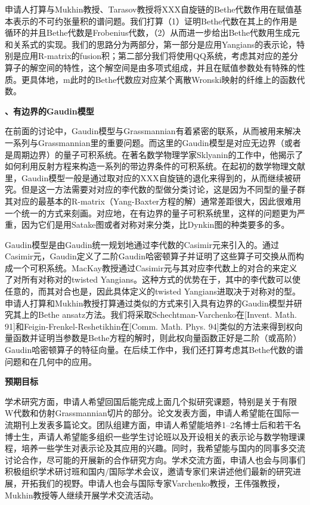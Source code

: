 \documentclass[12pt,UTF8,AutoFakeBold=4,a4paper]{ctexart}
\begin{document}
申请人打算与Mukhin教授、Tarasov教授将XXX自旋链的Bethe代数作用在赋值基本表示的不可约张量积的谱问题。我们打算（1）证明Bethe代数在其上的作用是循环的并且Bethe代数是Frobenius代数，（2）从而进一步给出Bethe代数用生成元和关系式的实现。我们的思路分为两部分，第一部分是应用Yangians的表示论，特别是应用R-matrix的fusion积；第二部分我们将使用QQ系统，考虑其对应的差分算子的解空间的特性，这个解空间是由多项式组成，并且在赋值参数处有特殊的性质。更具体地，m此时的Bethe代数应对应某个离散Wronski映射的纤维上的函数代数。

\medskip

\textbf{、有边界的Gaudin模型}

在前面的讨论中，Gaudin模型与Grassmannian有着紧密的联系，从而被用来解决一系列与Grassmannian里的重要问题。而这里的Gaudin模型是对应无边界（或者是周期边界）的量子可积系统。在著名数学物理学家Sklyanin的工作中，他揭示了如何利用反射方程来构造一系列的带边界条件的可积系统。在起初的数学物理文献里，Gaudin模型一般是通过取对应的XXX自旋链的退化来得到的，从而继续被研究。但是这一方法需要对对应的李代数的型做分类讨论，这是因为不同型的量子群其对应的最基本的R-matrix（Yang-Baxter方程的解）通常差距很大，因此很难用一个统一的方式来刻画。对应地，在有边界的量子可积系统里，这样的问题更为严重，因为它们是用Satake图或者对称对来分类，比Dynkin图的种类要多的多。

Gaudin模型是由Gaudin统一规划地通过李代数的Casimir元来引入的。通过Casimir元，Gaudin定义了二阶Gaudin哈密顿算子并证明了这些算子可交换从而构成一个可积系统。MacKay教授通过Casimir元与其对应李代数上的对合的来定义了对所有对称对的twisted Yangians。这种方式的优势在于，其中的李代数可以使任意的，而其对合也是，因此具体定义的twisted Yangians进取决于对称对的型。申请人打算和Mukhin教授打算通过类似的方式来引入具有边界的Gaudin模型并研究其上的Bethe ansatz方法。我们将采取Schechtman-Varchenko在[Invent. Math. 91]和Feigin-Frenkel-Reshetikhin在[Comm. Math. Phys. 94]类似的方法来得到权向量函数并证明当参数是Bethe方程的解时，则此权向量函数正好是二阶（或高阶）Gaudin哈密顿算子的特征向量。在后续工作中，我们还打算考虑其Bethe代数的谱问题和在几何中的应用。




\medskip

\textbf{\sihao 预期目标}

学术研究方面，申请人希望回国后能完成上面几个拟研究课题，特别是关于有限W代数和仿射Grassmannian切片的部分。论文发表方面，申请人希望能在国际一流期刊上发表多篇论文。团队组建方面，申请人希望能培养1--2名博士后和若干名博士生，声请人希望能多组织一些学生讨论班以及开设相关的表示论与数学物理课程，培养一些学生对表示论及其应用的兴趣。同时，我希望能与国内的同事多交流讨论合作，尽可能的开展新的合作研究方向。学术交流方面，申请人也会与同事们积极组织学术研讨班和国内/国际学术会议，邀请专家们来讲述他们最新的研究进展，开拓我们的视野。申请人也会与国际专家Varchenko教授，王伟强教授，Mukhin教授等人继续开展学术交流活动。
\end{document}
